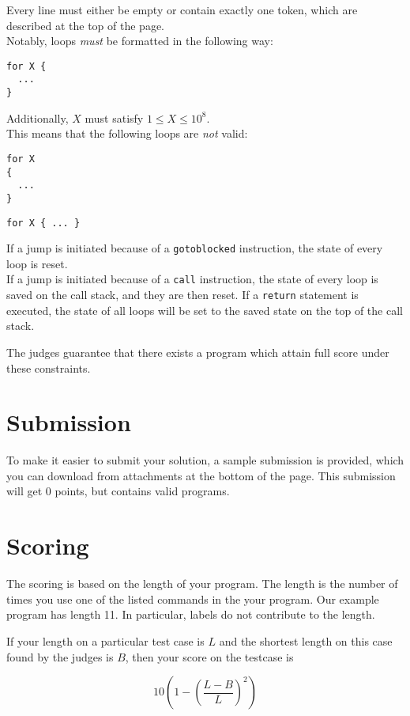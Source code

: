 Every line must either be empty or contain exactly one token, which are described at the top of the page. \\
Notably, loops \textit{must} be formatted in the following way:
\begin{verbatim}
for X {
  ...
}
\end{verbatim}
Additionally, $X$ must satisfy $1 \leq X \leq 10^8$.\\
This means that the following loops are \textit{not} valid:
\begin{verbatim}
for X
{
  ...
}
\end{verbatim}
\begin{verbatim}
for X { ... }
\end{verbatim}


If a jump is initiated because of a \texttt{gotoblocked} instruction, the state of every loop is reset. \\
If a jump is initiated because of a \texttt{call} instruction, the state of every loop is saved on the call stack, and they are then reset.
If a \texttt{return} statement is executed, the state of all loops will be set to the saved state on the top of the call stack.


The judges guarantee that there exists a program which attain full score under these constraints.

\section*{Submission}
To make it easier to submit your solution, a sample submission is provided, which you can download from attachments at the bottom of the page.
This submission will get 0 points, but contains valid programs.

\section*{Scoring}
The scoring is based on the length of your program. The length is the number of times you use one
of the listed commands in the your program. Our example program has length 11. In particular, labels
do not contribute to the length.

If your length on a particular test case is $L$ and the shortest length on this case found by the
judges is $B$, then your score on the testcase is

\[ 10 (1 - (\frac{L - B}{L})^2)\]
